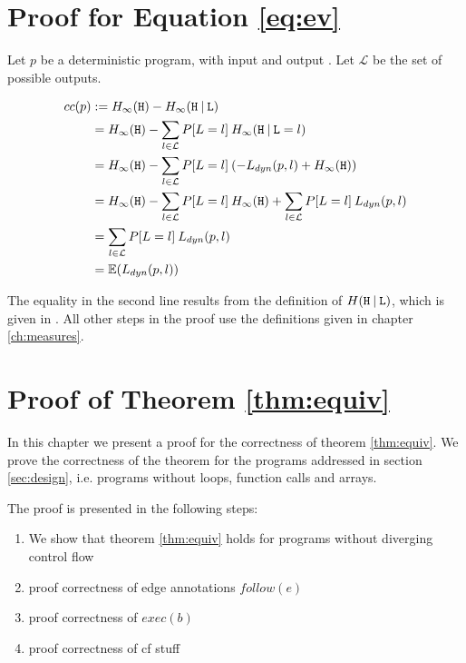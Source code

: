 \chapter{Proof for Equation \ref{eq:ev}}\label{ch:evProof}

Let $p$ be a deterministic program, with input \In and output \Out. Let $\mathcal{L}$ be the set of possible outputs.

\begin{align*}
    cc(p) &:= H_\infty(\mathtt{H}) - H_\infty(\mathtt{H} \: | \: \mathtt{L}) \\
    &= H_\infty(\mathtt{H}) - \sum\limits_{l \in \mathcal{L}} P[L = l]\: H_\infty(\mathtt{H} \: | \: \mathtt{L} = l) \\
    &= H_\infty(\mathtt{H}) - \sum\limits_{l \in \mathcal{L}} P[L = l]\: (-L_{dyn}(p, l) + H_\infty(\mathtt{H})) \\
    &= H_\infty(\mathtt{H}) - \sum\limits_{l \in \mathcal{L}} P[L = l]\: H_\infty(\mathtt{H}) + \sum\limits_{l \in \mathcal{L}} P[L = l]\: L_{dyn}(p, l) \\
    &= \sum\limits_{l \in \mathcal{L}} P[L = l] \: L_{dyn}(p, l) \\
    &= \mathbb{E}(L_{dyn}(p,l))
\end{align*}

The equality in the second line results from the definition of $H( \mathtt{H} \: |\: \mathtt{L})$, which is given in \cite{smith09}. All other steps in the proof use the definitions given in chapter \ref{ch:measures}.

\chapter{Proof of Theorem \ref{thm:equiv}}\label{ch:proofEquiv}

In this chapter we present a proof for the correctness of theorem \ref{thm:equiv}. We prove the correctness of the theorem for the programs addressed in section \ref{sec:design}, i.e. programs without loops, function calls and arrays.

The proof is presented in the following steps:
\begin{enumerate}
    \setlength\itemsep{0em}
    \item We show that theorem \ref{thm:equiv} holds for programs without diverging control flow
    \item proof correctness of edge annotations $follow(e)$
    \item proof correctness of $exec(b)$
    \item proof correctness of cf stuff
\end{enumerate}

